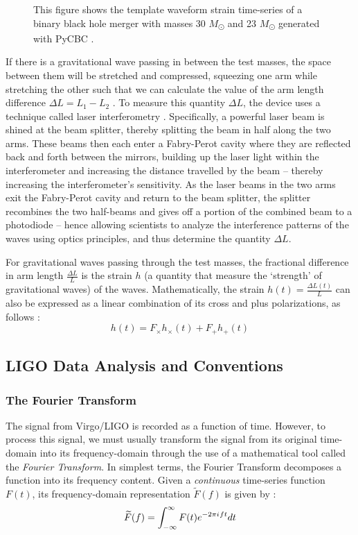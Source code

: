 \documentclass[preprint,
letterpaper,
 amsmath,amssymb,
 aps,
]{revtex4-2}
\newcommand{\iu}{{i\mkern1mu}}
\begin{document}
\begin{figure}[!tbp]
\begin{minipage}[b]{0.48\textwidth}
    \caption{This figure shows the template waveform strain time-series of a binary black hole merger with masses 30 $M$\textsubscript{\(\odot\)} and 23 $M$\textsubscript{\(\odot\)} generated with PyCBC \cite{pycbc}.}
  \end{minipage}
\end{figure}
If there is a gravitational wave passing in between the test masses, the space between them will be stretched and compressed, squeezing one arm while stretching the other such that we can calculate the value of the arm length difference $\Delta L = L_1 - L_2$ \cite{teacherintro}. To measure this quantity $\Delta L$, the device uses a technique called laser interferometry \cite{LIGOArxiv}. Specifically, a powerful laser beam is shined at the beam splitter, thereby splitting the beam in half along the two arms. These beams then each enter a Fabry-Perot cavity where they are reflected back and forth between the mirrors, building up the laser light within the interferometer and increasing the distance travelled by the beam \cite{fabry} – thereby increasing the interferometer's sensitivity. As the laser beams in the two arms exit the Fabry-Perot cavity and return to the beam splitter, the splitter recombines the two half-beams and gives off a portion of the combined beam to a photodiode – hence allowing scientists to analyze the interference patterns of the waves using optics principles, and thus determine the quantity $\Delta L$. 

For gravitational waves passing through the test masses, the fractional difference in arm length $\frac{\Delta L}{L}$ is the strain $h$ (a quantity that measure the `strength' of gravitational waves) of the waves. Mathematically, the strain $h(t) = \frac{\Delta L(t)}{L}$ can also be expressed as a linear combination of its cross and plus polarizations, as follows \cite{JSTORLIGO}:
\begin{equation}
h(t) = F_\times h_\times (t) + F_+ h_+ (t)
\end{equation}

\subsection{LIGO Data Analysis and Conventions} \label{data anal}
\subsubsection{The Fourier Transform}
The signal from Virgo/LIGO is recorded as a function of time. However, to process this signal, we must usually transform the signal from its original time-domain into its frequency-domain through the use of a mathematical tool called the \textit{Fourier Transform}. In simplest terms, the Fourier Transform decomposes a function into its frequency content. Given a \textit{continuous} time-series function $F(t)$, its frequency-domain representation $\widetilde{F}(f)$ is given by \cite{dsptextbook}:
\begin{equation}
\widetilde{F}(f) = \int_{-\infty}^{\infty}F(t)e^{-2\pi\iu ft} dt
\end{equation}
\end{document}
